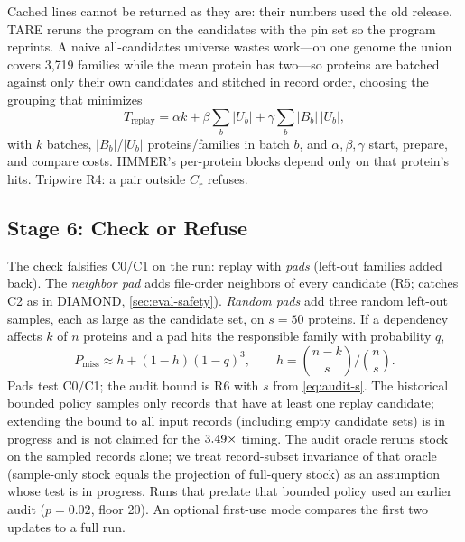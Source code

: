 \documentclass[letterpaper,twocolumn,10pt]{article}
\theoremstyle{definition}
\newcommand{\sys}{TARE\xspace}
\newcommand{\sys}{PARE\xspace}
\begin{document}
Cached lines cannot be returned as they are: their numbers used the old release. \sys reruns the program on the
candidates with the pin set so the program reprints. A naive all\nobreakdash-candidates universe wastes work---on one genome the
union covers 3{,}719 families while the mean protein has two---so proteins are batched against only their own
candidates and stitched in record order, choosing the grouping that minimizes
\begin{equation}
T_{\text{replay}} = \alpha k + \beta \sum_b |U_b| + \gamma \sum_b |B_b|\,|U_b|,
\label{eq:batch}
\end{equation}
with $k$ batches, $|B_b|$/$|U_b|$ proteins/families in batch $b$, and $\alpha,\beta,\gamma$ start, prepare, and
compare costs. HMMER's per\nobreakdash-protein blocks depend only on that protein's hits. Tripwire R4: a pair outside
$C_r$ refuses.

\subsection{Stage 6: Check or Refuse}
\label{sec:check}

The check falsifies C0/C1 on the run: replay with \textit{pads} (left\nobreakdash-out families added back). The
\textit{neighbor pad} adds file\nobreakdash-order neighbors of every candidate (R5; catches C2 as in DIAMOND,
\cref{sec:eval-safety}). \textit{Random pads} add three random left\nobreakdash-out samples, each as large as the candidate set,
on $s{=}50$ proteins.
If a dependency affects $k$ of $n$ proteins and a pad hits the responsible family with probability $q$,
\begin{equation}
P_{\text{miss}} \approx h + (1-h)(1-q)^3, \qquad h = \binom{n-k}{s}\Big/\binom{n}{s}.
\label{eq:miss}
\end{equation}
Pads test C0/C1; the audit bound is R6 with $s$ from \cref{eq:audit-s}. The historical bounded policy samples only records that
have at least one replay candidate; extending the bound to all input records (including empty candidate sets) is in
progress and is not claimed for the $3.49\times$ timing. The audit oracle reruns stock on the sampled records
alone; we treat record\nobreakdash-subset invariance of that oracle (sample\nobreakdash-only stock equals the projection of full\nobreakdash-query stock)
as an assumption whose test is in progress. Runs that predate that bounded policy used an earlier audit ($p{=}0.02$,
floor 20). An optional first\nobreakdash-use mode compares the first two updates to a full run.
\end{document}
